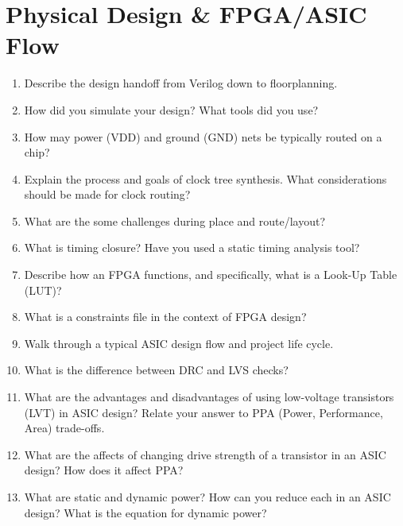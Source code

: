 \documentclass[11pt]{article}
\begin{document}
\section{Physical Design \& FPGA/ASIC Flow}
\begin{enumerate}
    \item Describe the design handoff from Verilog down to floorplanning.
    \item How did you simulate your design? What tools did you use?
    \item How may power (VDD) and ground (GND) nets be typically routed on a chip?
    \item Explain the process and goals of clock tree synthesis. What considerations should be made for clock
    routing?
    \item What are the some challenges during place and route/layout?
    \item What is timing closure? Have you used a static timing analysis tool?
    \item Describe how an FPGA functions, and specifically, what is a Look-Up
    Table (LUT)?
    \item What is a constraints file in the context of FPGA design?
    \item Walk through a typical ASIC design flow and project life cycle.
    \item What is the difference between DRC and LVS checks?
    \item What are the advantages and disadvantages of using low-voltage transistors (LVT) in ASIC design? Relate your answer to PPA (Power, Performance, Area) trade-offs.
    \item What are the affects of changing drive strength of a transistor in an ASIC design? How does it affect PPA?
    \item What are static and dynamic power? How can you reduce each in an ASIC design? What is the equation for dynamic power?
\end{enumerate}

\end{document}
